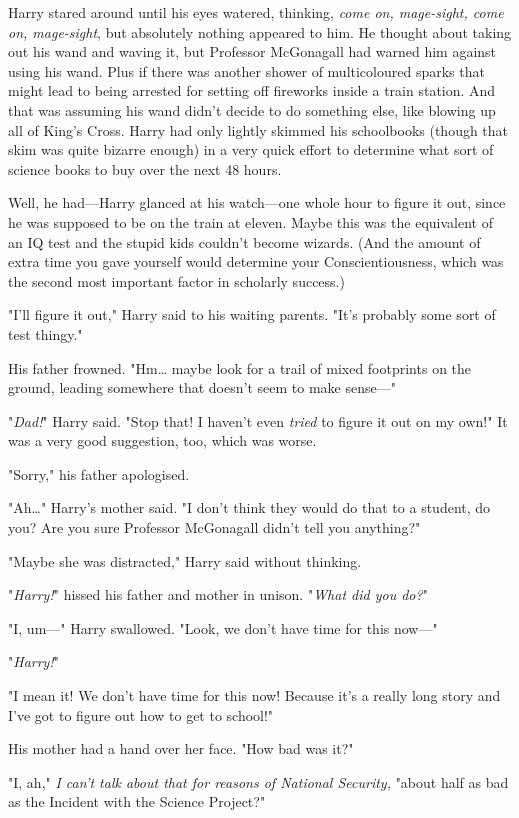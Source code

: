 Harry stared around until his eyes watered, thinking, \emph{come on,
mage-sight, come on, mage-sight}, but absolutely nothing appeared to him. He
thought about taking out his wand and waving it, but Professor McGonagall had
warned him against using his wand. Plus if there was another shower of
multicoloured sparks that might lead to being arrested for setting off
fireworks inside a train station. And that was assuming his wand didn't decide
to do something else, like blowing up all of King's Cross. Harry had only
lightly skimmed his schoolbooks (though that skim was quite bizarre enough) in
a very quick effort to determine what sort of science books to buy over the
next 48 hours.

Well, he had---Harry glanced at his watch---one whole hour to figure it out,
since he was supposed to be on the train at eleven. Maybe this was the
equivalent of an IQ test and the stupid kids couldn't become wizards. (And the
amount of extra time you gave yourself would determine your Conscientiousness,
which was the second most important factor in scholarly success.)

"I'll figure it out," Harry said to his waiting parents. "It's probably some
sort of test thingy."

His father frowned. "Hm{\ldots} maybe look for a trail of mixed footprints on
the ground, leading somewhere that doesn't seem to make sense---"

"\emph{Dad!}" Harry said. "Stop that! I haven't even \emph{tried} to figure it
out on my own!" It was a very good suggestion, too, which was worse.

"Sorry," his father apologised.

"Ah{\ldots}" Harry's mother said. "I don't think they would do that to a
student, do you? Are you sure Professor McGonagall didn't tell you anything?"

"Maybe she was distracted," Harry said without thinking.

"\emph{Harry!}" hissed his father and mother in unison. "\emph{What did you
do?}"

"I, um---" Harry swallowed. "Look, we don't have time for this now---"

"\emph{Harry!}"

"I mean it! We don't have time for this now! Because it's a really long story
and I've got to figure out how to get to school!"

His mother had a hand over her face. "How bad was it?"

"I, ah," \emph{I can't talk about that for reasons of National Security,}
"about half as bad as the Incident with the Science Project?"

